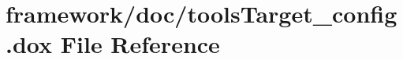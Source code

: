 \hypertarget{tools_target__config_8dox}{}\section{framework/doc/tools\+Target\+\_\+config.dox File Reference}
\label{tools_target__config_8dox}
